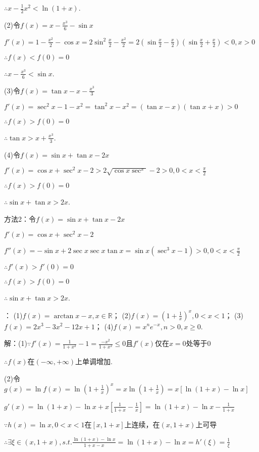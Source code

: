 \documentclass[12pt,UTF8]{ctexart}
\begin{document}
\begin{enumerate}
$\therefore x-\frac12x^2<\ln(1+x)$.

(2)令$f(x)=x-\frac{x^3}6-\sin x$

$f'(x)=1-\frac{x^2}2-\cos x=2\sin^2\frac x2-\frac{x^2}2=2(\sin\frac x2-\frac x2)(\sin\frac x2+\frac x2)<0,x>0$

$\therefore f(x)<f(0)=0$

$\therefore x-\frac{x^3}6<\sin x$.

(3)令$f(x)=\tan x-x-\frac{x^3}3$

$f'(x)=\sec^2x-1-x^2=\tan^2x-x^2=(\tan x-x)(\tan x+x)>0$

$\therefore f(x)>f(0)=0$

$\therefore \tan x>x+\frac{x^3}3$.

(4)令$f(x)=\sin x+\tan x-2x$

$f'(x)=\cos x+\sec^2x-2>2\sqrt{\cos x\sec^x}-2>0,0<x<\frac\pi2$

$\therefore f(x)>f(0)=0$

$\therefore \sin x+\tan x>2x$.

方法2：令$f(x)=\sin x+\tan x-2x$

$f'(x)=\cos x+\sec^2x-2$

$f''(x)=-\sin x+2\sec x\sec x\tan x=\sin x(\sec^3x-1)>0,0<x<\frac\pi2$

$\therefore f'(x)>f'(0)=0$

$\therefore f(x)>f(0)=0$

$\therefore \sin x+\tan x>2x$.

：
\newline
(1)$f(x)=\arctan x-x,x\in\mathbb R$；
\newline
(2)$f(x)=(1+\frac1x)^x,0<x<1$；
\newline
(3)$f(x)=2x^3-3x^2-12x+1$；
\newline
(4)$f(x)=x^ne^{-x},n>0,x\geq0$.

解：(1)$\because f'(x)=\frac1{1+x^2}-1=\frac{-x^2}{1+x^2}\leq0$且$f'(x)$仅在$x=0$处等于0

$\therefore f(x)$在$(-\infty,+\infty)$上单调增加.

(2)令$g(x)=\ln f(x)=\ln(1+\frac1x)^x=x\ln(1+\frac1x)=x[\ln(1+x)-\ln x]$

$g'(x)=\ln(1+x)-\ln x+x[\frac1{1+x}-\frac1x]=\ln(1+x)-\ln x-\frac1{1+x}$

$\because h(x)=\ln x,0<x<1$在$[x,1+x]$上连续，在$(x,1+x)$上可导

$\therefore\exists\xi\in(x,1+x),s.t.\frac{\ln(1+x)-\ln x}{1+x-x}=\ln(1+x)-\ln x=h'(\xi)=\frac1\xi$


\end{enumerate}
\end{document}
